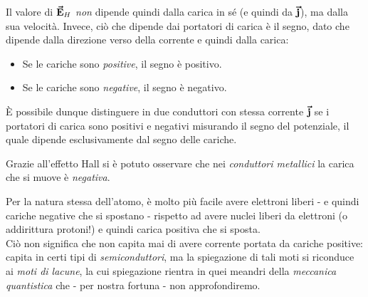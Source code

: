 Il valore di $\vb*{\va{E}}_H$ \textit{non} dipende quindi dalla carica in sé (e quindi da $\vb*{\va{j}}$), ma dalla sua velocità. Invece, ciò che dipende dai portatori di carica è il segno, dato che dipende dalla direzione verso della corrente e quindi dalla carica:
\begin{itemize}
	\item Se le cariche sono \textit{positive}, il segno è positivo.
	\item Se le cariche sono \textit{negative}, il segno è negativo.
\end{itemize}
È possibile dunque distinguere in due conduttori con stessa corrente $\vb*{\va{j}}$ se i portatori di carica sono positivi e negativi misurando il segno del potenziale, il quale dipende esclusivamente dal segno delle cariche.
\begin{example}
	Grazie all'effetto Hall si è potuto osservare che nei \textit{conduttori metallici} la carica che si muove è \textit{negativa}.
\end{example}
\begin{digression}
	Per la natura stessa dell'atomo, è molto più facile avere elettroni liberi - e quindi cariche negative che si spostano - rispetto ad avere nuclei liberi da elettroni (o addirittura protoni!) e quindi carica positiva che si sposta.\\
	Ciò non significa che non capita mai di avere corrente portata da cariche positive: capita in certi tipi di \textit{semiconduttori}, ma la spiegazione di tali moti si riconduce ai \textit{moti di lacune}, la cui spiegazione rientra in quei meandri della \textit{meccanica quantistica} che - per nostra fortuna - non approfondiremo. 
\end{digression}

